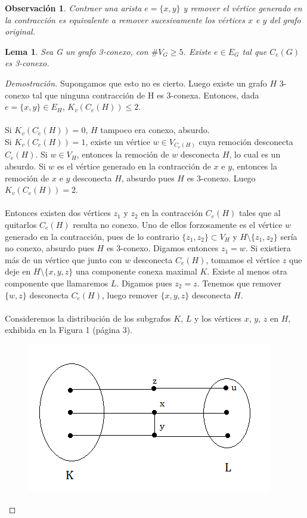 \documentclass{article}
\newtheorem{lemma}{Lema}
\newtheorem*{obs}{Observación}
\begin{document}
\begin{obs}
Contraer una arista $e = \{x,y\}$ y remover el vértice generado en la contracción es equivalente a remover sucesivamente los vértices $x$ e $y$ del grafo original.
\end{obs}
\begin{lemma}
Sea G un grafo 3-conexo, con $\#V_G \ge 5$. Existe $e \in E_G$ tal que $C_e(G)$ es 3-conexo.
\end{lemma}
\begin{proof}[Demostración]
Supongamos que esto no es cierto. Luego existe un grafo $H$ 3-conexo tal que ninguna contracción de H es 3-conexa. Entonces, dada $e = \{x,y\} \in E_H$, $K_v(C_e(H)) \le 2$.\\ \\
Si $K_v(C_e(H)) = 0$, $H$ tampoco era conexo, absurdo.\\
Si $K_v(C_e(H)) = 1$, existe un vértice $w \in V_{C_e(H)}$ cuya remoción desconecta $C_e(H)$. Si $w \in V_H$, entonces la remoción de $w$ desconecta $H$, lo cual es un absurdo. Si $w$ es el vértice generado en la contracción de $x$ e $y$, entonces la remoción de $x$ e $y$ desconecta $H$, absurdo pues $H$ es 3-conexo. Luego $K_v(C_e(H)) = 2$.\\ \\
Entonces existen dos vértices $z_1$ y $z_2$ en la contracción $C_e(H)$ tales que al quitarlos $C_e(H)$ resulta no conexo. Uno de ellos forzosamente es el vértice $w$ generado en la contracción, pues de lo contrario $\{z_1,z_2\} \subset V_H$  y $H \setminus \{z_1,z_2\}$ sería no conexo, absurdo pues $H$ es 3-conexo. Digamos entonces $z_1 = w$. Si existiera más de un vértice que junto con $w$ desconecta $C_e(H)$, tomamos el vértice $z$ que deje en $H \setminus\{x,y,z\}$ una componente conexa maximal $K$. Existe al menos otra componente que llamaremos $L$. Digamos pues $z_2 = z$. Tenemos que remover $\{w,z\}$ desconecta $C_e(H)$, luego remover $\{x,y,z\}$ desconecta $H$. \\ \\
Consideremos la distribución de los subgrafos $K$, $L$ y los vértices $x$, $y$, $z$ en $H$, exhibida en la Figura 1 (página 3). 
\begin{figure}[h]
\centering
\includegraphics{img/kura1}

\end{figure}
\end{proof}
\end{document}
